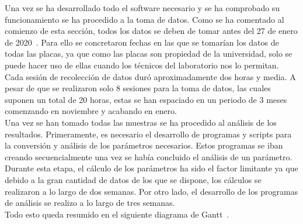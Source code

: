 \documentclass[spanish]{template/minim}
\begin{document}
Una vez se ha desarrollado todo el software necesario y se ha comprobado su funcionamiento se ha procedido a la toma de datos. Como se ha comentado al comienzo de esta sección, todos los datos se deben de tomar antes del 27 de enero de 2020~. Para ello se concretaron fechas en las que se tomarían los datos de todas las placas, ya que como las placas son propiedad de la universidad, solo se puede hacer uso de ellas cuando los técnicos del laboratorio nos lo permitan. Cada sesión de recolección de datos duró aproximadamente dos horas y media. A pesar de que se realizaron solo 8 sesiones para la toma de datos, las cuales suponen un total de 20 horas, estas se han espaciado en un periodo de 3 meses comenzando en noviembre y acabando en enero.\\

Una vez se han tomado todas las muestras se ha procedido al análisis de los resultados. Primeramente, es necesario el desarrollo de programas y scripts para la conversión y análisis de los parámetros necesarios. Estos programas se iban creando secuencialmente una vez se había concluido el análisis de un parámetro. Durante esta etapa, el cálculo de los parámetros ha sido el factor limitante ya que debido a la gran cantidad de datos de los que se dispone, los cálculos se realizaron a lo largo de dos semanas. Por otro lado, el desarrollo de los programas de análisis se realizo a lo largo de tres semanas.\\

Todo esto queda resumido en el siguiente diagrama de Gantt~.\\
\end{document}
